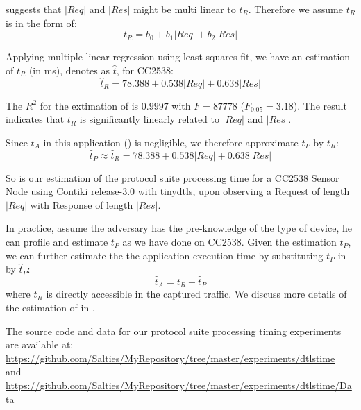  suggests that $|Req|$ and $|Res|$ might be multi linear to $t_R$. Therefore we assume $t_R$ is in the form of:
\begin{equation} \label{Eq: tR est}
	t_R = b_0 + b_1|Req| + b_2|Res|
\end{equation}

Applying multiple linear regression using least squares fit, we have an estimation of $t_R$ (in ms), denotes as $\hat{t}$, for CC2538:
\begin{equation}
	\hat{t}_R = 78.388 + 0.538|Req| + 0.638|Res|
	\label{Eq: t_R estimation}
\end{equation}

The $R^2$ for the extimation of  is $0.9997$ with $F=87778$ ($F_{0.05} = 3.18$). The result indicates that $t_R$ is significantly linearly related to $|Req|$ and $|Res|$.

Since $t_A$ in this application () is negligible, we therefore approximate $t_P$ by $t_R$:
\begin{equation} \label{Eq: CC2538tP}
	\hat{t}_P \approx \hat{t}_R = 78.388 + 0.538|Req| + 0.638|Res|
\end{equation}

So  is our estimation of the protocol suite processing time for a CC2538 Sensor Node using Contiki release-3.0 with tinydtls, upon observing a Request of length $|Req|$ with Response of length $|Res|$.

In practice, assume the adversary has the pre-knowledge of the type of device, he can profile and estimate $t_P$ as we have done on CC2538. Given the estimation $\hat{t}_P$, we can further estimate the the application execution time by substituting $t_P$ in  by $\hat{t}_P$:
\begin{equation} \label{Eq: hattA}
	\hat{t}_A = t_R - \hat{t}_P
\end{equation}
where $t_R$ is directly accessible in the captured traffic. We discuss more details of the estimation of  in .

The source code and data for our protocol suite processing timing experiments are available at: \\
\url{https://github.com/Salties/MyRepository/tree/master/experiments/dtlstime} \\
and \\
\url{https://github.com/Salties/MyRepository/tree/master/experiments/dtlstime/Data}

